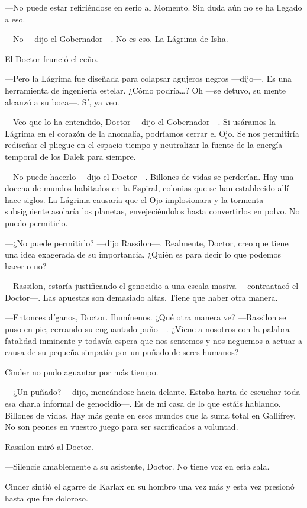 —No puede estar refiriéndose en serio al Momento. Sin duda aún no se ha llegado a eso.

—No —dijo el Gobernador—. No es eso. La Lágrima de Isha.

El Doctor frunció el ceño. 

—Pero la Lágrima fue diseñada para colapsar agujeros negros —dijo—. Es una herramienta de ingeniería estelar. ¿Cómo podría…? Oh —se detuvo, su mente alcanzó a su boca—. Sí, ya veo.

—Veo que lo ha entendido, Doctor —dijo el Gobernador—. Si usáramos  la Lágrima en el corazón de la anomalía, podríamos cerrar el Ojo. Se nos permitiría rediseñar el pliegue en el espacio-tiempo y neutralizar la fuente de la energía temporal de los Dalek para siempre.

—No puede hacerlo —dijo el Doctor—. Billones de vidas se perderían. Hay una docena de mundos habitados en la Espiral, colonias que se han establecido allí hace siglos. La Lágrima causaría que el Ojo implosionara y la tormenta subsiguiente asolaría los planetas, envejeciéndolos hasta convertirlos en polvo. No puedo permitirlo.

—¿No puede permitirlo? —dijo Rassilon—. Realmente, Doctor, creo que tiene una idea exagerada de su importancia. ¿Quién es para decir lo que podemos hacer o no?

—Rassilon, estaría justificando el genocidio a una escala masiva —contraatacó el Doctor—. Las apuestas son demasiado altas. Tiene que haber otra manera.

—Entonces díganos, Doctor. Ilumínenos. ¿Qué otra manera ve? —Rassilon se puso en pie, cerrando su enguantado puño—. ¿Viene a nosotros con la palabra fatalidad inminente y todavía espera que nos sentemos y nos neguemos a actuar a causa de su pequeña simpatía por un puñado de seres humanos?

Cinder no pudo aguantar por más tiempo. 

—¿Un puñado? —dijo, meneándose hacia delante. Estaba harta de escuchar toda esa charla informal de genocidio—. Es de mi casa de lo que estáis hablando. Billones de vidas. Hay más gente en esos mundos que la suma total en Gallifrey. No son peones en vuestro juego para ser sacrificados a voluntad.

Rassilon miró al Doctor. 

—Silencie amablemente a su asistente, Doctor. No tiene voz en esta sala.

Cinder sintió el agarre de Karlax en su hombro una vez más y esta vez presionó hasta que fue doloroso. 

